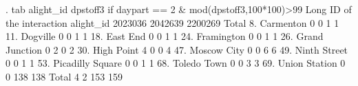 . tab alight_id dpstoff3 if daypart == 2 \& mod(dpstoff3,100*100)>99
{\smallskip}
                      {\VBAR}    Long ID of the interaction
            alight_id {\VBAR}   2023036    2042639    2200269 {\VBAR}     Total
         8. Carmenton {\VBAR}         0          0          1 {\VBAR}         1 
         11. Dogville {\VBAR}         0          0          1 {\VBAR}         1 
         18. East End {\VBAR}         0          0          1 {\VBAR}         1 
       24. Framington {\VBAR}         0          0          1 {\VBAR}         1 
   26. Grand Junction {\VBAR}         0          2          0 {\VBAR}         2 
       30. High Point {\VBAR}         4          0          0 {\VBAR}         4 
      47. Moscow City {\VBAR}         0          0          6 {\VBAR}         6 
     49. Ninth Street {\VBAR}         0          0          1 {\VBAR}         1 
 53. Picadilly Square {\VBAR}         0          0          1 {\VBAR}         1 
      68. Toledo Town {\VBAR}         0          0          3 {\VBAR}         3 
    69. Union Station {\VBAR}         0          0        138 {\VBAR}       138 
                Total {\VBAR}         4          2        153 {\VBAR}       159 
{\smallskip}
{\smallskip}
